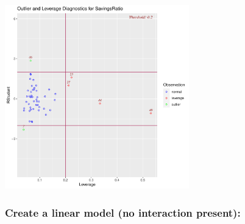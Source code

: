 \documentclass{article}\usepackage[]{graphicx}\usepackage[]{color}
\newenvironment{knitrout}{}{} %
\begin{document}
\begin{knitrout}
{\centering \includegraphics[width=0.6\textwidth]{figure/unnamed-chunk-3-1} 

}



\end{knitrout}

\subsubsection*{Create a linear model (no interaction present):}
\end{document}
